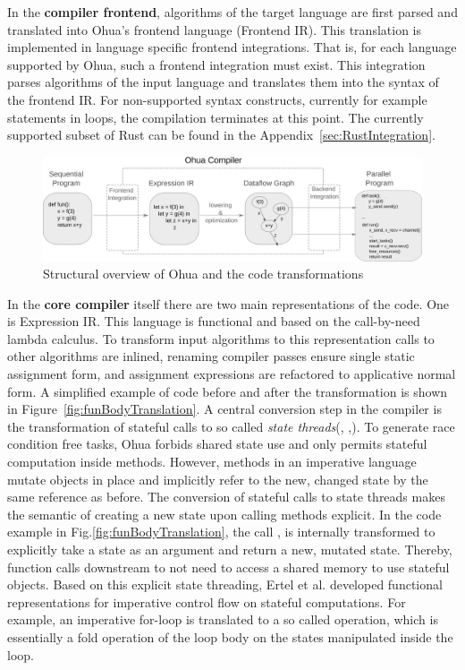 In the \textbf{compiler frontend}, algorithms of the target language are first parsed and translated into Ohua's frontend language (Frontend IR). This translation is implemented in language specific frontend integrations. That is, for each language supported by Ohua, such a frontend integration must exist. This integration parses algorithms of the input language and translates them into the syntax of the frontend IR. For non-supported syntax constructs, currently for example  statements in loops, the compilation terminates at this point. The currently supported subset of Rust can be found in the Appendix~\ref{sec:RustIntegration}.

\begin{figure}[H]
    \centering
    \includegraphics[scale= 0.36]{figures/ohua_fine_with_channels.png}
    \caption{Structural overview of Ohua and the code transformations}
    \label{fig:ohua_fine}
\end{figure}

In the \textbf{core compiler} itself there are two main representations of the code. One is Expression IR. This language is functional and based on the call-by-need lambda calculus. To transform input algorithms to this representation 
calls to other algorithms are inlined, renaming compiler passes ensure single static assignment form, and assignment expressions are refactored to applicative normal form. A simplified example of code before and after the transformation is shown in Figure~\ref{fig:funBodyTranslation}. A central conversion step in the compiler is the transformation of stateful calls to so called \emph{state threads}(\cite{wadler1992essence}, \cite{launchbury1994lazy},\cite{ertel2019stclang}). To generate race condition free tasks, Ohua forbids shared state use and only permits stateful computation inside methods. However, methods in an imperative language mutate objects in place and implicitly refer to the new, changed state by the same reference as before. The conversion of stateful calls to state threads makes the semantic of creating a new state upon calling methods explicit. In the code example in Fig.\ref{fig:funBodyTranslation}, the call , is internally transformed to explicitly take a state as an argument and return a new, mutated state. Thereby, function calls downstream to not need to access a shared memory to use stateful objects. Based on this explicit state threading, Ertel et al. \cite{ertel2019stclang, ertel2018supporting} developed functional representations for imperative control flow on stateful computations. For example, an imperative for-loop is translated to a so called  operation, which is essentially a fold operation of the loop body on the states manipulated inside the loop. 

